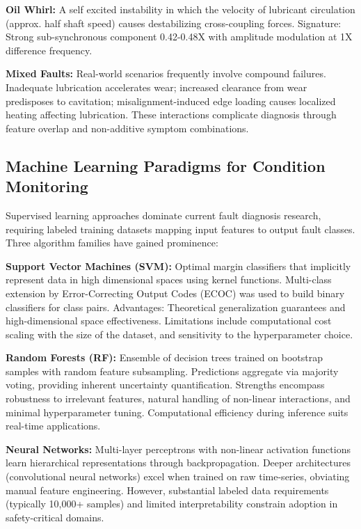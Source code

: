 \documentclass[11pt,a4paper]{article}
\begin{document}
\textbf{Oil Whirl:} A self excited instability in which the velocity of lubricant circulation (approx. half shaft speed) causes destabilizing cross-coupling forces. Signature: Strong sub-synchronous component 0.42-0.48X with amplitude modulation at 1X difference frequency.

\textbf{Mixed Faults:} Real-world scenarios frequently involve compound failures. Inadequate lubrication accelerates wear; increased clearance from wear predisposes to cavitation; misalignment-induced edge loading causes localized heating affecting lubrication. These interactions complicate diagnosis through feature overlap and non-additive symptom combinations.

\subsection{Machine Learning Paradigms for Condition Monitoring}

Supervised learning approaches dominate current fault diagnosis research, requiring labeled training datasets mapping input features to output fault classes. Three algorithm families have gained prominence:

\textbf{Support Vector Machines (SVM):} Optimal margin classifiers that implicitly represent data in high dimensional spaces using kernel functions. Multi-class extension by Error-Correcting Output Codes (ECOC) was used to build binary classifiers for class pairs. Advantages: Theoretical generalization guarantees and high-dimensional space effectiveness. Limitations include computational cost scaling with the size of the dataset, and sensitivity to the hyperparameter choice.

\textbf{Random Forests (RF):} Ensemble of decision trees trained on bootstrap samples with random feature subsampling. Predictions aggregate via majority voting, providing inherent uncertainty quantification. Strengths encompass robustness to irrelevant features, natural handling of non-linear interactions, and minimal hyperparameter tuning. Computational efficiency during inference suits real-time applications.

\textbf{Neural Networks:} Multi-layer perceptrons with non-linear activation functions learn hierarchical representations through backpropagation. Deeper architectures (convolutional neural networks) excel when trained on raw time-series, obviating manual feature engineering. However, substantial labeled data requirements (typically 10,000+ samples) and limited interpretability constrain adoption in safety-critical domains.
\end{document}
